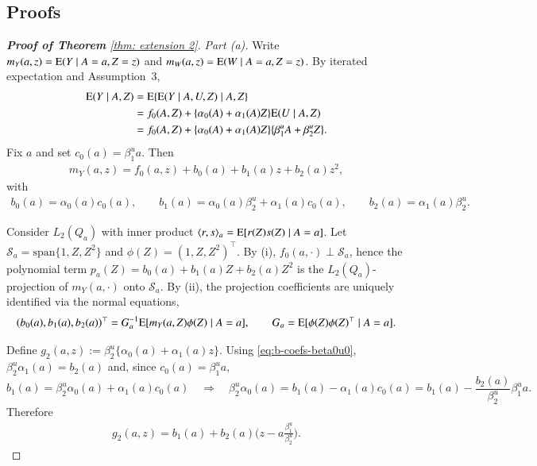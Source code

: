 \subsection{Proofs}



\begin{proof}[\hypertarget{proof of thm extension 2}{\textbf{Proof of Theorem}} \ref{thm: extension 2}]
\emph{Part (a).} Write $m_Y(a,z)=\mathrm{E}(Y\mid A=a,Z=z)$ and $m_W(a,z)=\mathrm{E}(W\mid A=a,Z=z)$.
By iterated expectation and Assumption~3,
\begin{align*}
\mathrm{E}(Y\mid A,Z)
&=\mathrm{E}\{\mathrm{E}(Y\mid A,U,Z)\mid A,Z\}\\
&= f_0(A,Z)+\{\alpha_0(A)+\alpha_1(A)Z\}\mathrm{E}(U\mid A,Z)\\
&= f_0(A,Z)+\{\alpha_0(A)+\alpha_1(A)Z\}\{\beta_1^u A+\beta_2^u Z\}.
\end{align*}
Fix $a$ and set $c_0(a)=\beta_1^u a$. Then
\begin{align}
m_Y(a,z)= f_0(a,z) + b_0(a)+b_1(a)z+b_2(a)z^2,
\label{eq:poly-decomp-beta0u0}
\end{align}
with
\begin{align}
b_0(a)=\alpha_0(a)c_0(a),\qquad
b_1(a)=\alpha_0(a)\beta_2^u+\alpha_1(a)c_0(a),\qquad
b_2(a)=\alpha_1(a)\beta_2^u.
\label{eq:b-coefs-beta0u0}
\end{align}

Consider $L_2(Q_a)$ with inner product
$\langle r,s\rangle_a=\mathrm{E}[r(Z)s(Z)\mid A=a]$.
Let $\mathcal S_a=\mathrm{span}\{1,Z,Z^2\}$ and $\phi(Z)=(1,Z,Z^2)^\top$.
By (i), $f_0(a,\cdot)\perp\mathcal S_a$, hence the polynomial term
$p_a(Z)=b_0(a)+b_1(a)Z+b_2(a)Z^2$ is the $L_2(Q_a)$-projection of $m_Y(a,\cdot)$ onto $\mathcal S_a$.
By (ii), the projection coefficients are uniquely identified via the normal equations,
\[
(b_0(a),b_1(a),b_2(a))^\top
=
G_a^{-1}\mathrm{E}[m_Y(a,Z)\phi(Z)\mid A=a],
\qquad
G_a=\mathrm{E}[\phi(Z)\phi(Z)^\top\mid A=a].
\]

Define $g_2(a,z):=\beta_2^u\{\alpha_0(a)+\alpha_1(a)z\}$. Using \eqref{eq:b-coefs-beta0u0}, $\beta_2^u\alpha_1(a)=b_2(a)$ and, since $c_0(a)=\beta_1^u a$,
\[
b_1(a)=\beta_2^u\alpha_0(a)+\alpha_1(a)c_0(a)
\quad\Rightarrow\quad
\beta_2^u\alpha_0(a)=b_1(a)-\alpha_1(a)c_0(a)
=b_1(a)-\frac{b_2(a)}{\beta_2^u}\beta_1^u a.
\]
Therefore
\begin{align}
g_2(a,z)
=
b_1(a)+b_2(a)\Big(z-a\frac{\beta_1^u}{\beta_2^u}\Big).
\label{eq:g2-b-form}
\end{align}


\end{proof}
